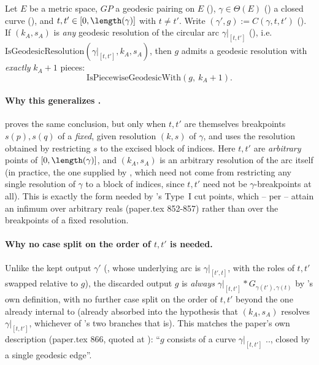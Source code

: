 \begin{lemma}
  Let $E$ be a metric space, $GP$ a geodesic pairing on $E$ (), $\gamma \in
  \Theta(E)$ () a closed curve (), and $t,t' \in
  [0,\length(\gamma)]$ with $t \ne t'$. Write $(\gamma',g) := C(\gamma,t,t')$ ().
  If $(k_A,s_A)$ is \emph{any} geodesic resolution of the circular arc $\gamma|_{[t,t']}$
  (), i.e.\ $\mathrm{IsGeodesicResolution}(\gamma|_{[t,t']},k_A,s_A)$, then $g$
  admits a geodesic resolution with \emph{exactly} $k_A+1$ pieces:
  \[
    \mathrm{IsPiecewiseGeodesicWith}(g,\ k_A+1)
    .
  \]

  \paragraph{Why this generalizes .}
   proves the same conclusion, but only when $t,t'$ are
  themselves breakpoints $s(p),s(q)$ of a \emph{fixed}, given resolution $(k,s)$ of $\gamma$, and
  uses the resolution obtained by restricting $s$ to the excised block of indices. Here $t,t'$ are
  \emph{arbitrary} points of $[0,\length(\gamma)]$, and $(k_A,s_A)$ is an arbitrary resolution of
  the arc itself (in practice, the one supplied by , which need not
  come from restricting any single resolution of $\gamma$ to a block of indices, since $t,t'$ need
  not be $\gamma$-breakpoints at all). This is exactly the form needed by 's Type~I
  cut points, which -- per  -- attain an infimum over arbitrary reals
  (paper.tex 852-857) rather than over the breakpoints of a fixed resolution.

  \paragraph{Why no case split on the order of $t,t'$ is needed.} Unlike the kept output $\gamma'$
  (, whose underlying arc is $\gamma|_{[t',t]}$, with the roles
  of $t,t'$ swapped relative to $g$), the discarded output $g$ is \emph{always}
  $\gamma|_{[t,t']} * G_{\gamma(t'),\gamma(t)}$ by 's own definition, with no
  further case split on the order of $t,t'$ beyond the one already internal to
   (already absorbed into the hypothesis that $(k_A,s_A)$ resolves
  $\gamma|_{[t,t']}$, whichever of 's two branches that is). This matches the
  paper's own description (paper.tex 866, quoted at ): ``$g$
  consists of a curve $\gamma|_{[t,t']}$ .., closed by a single geodesic edge''.


\end{lemma}
